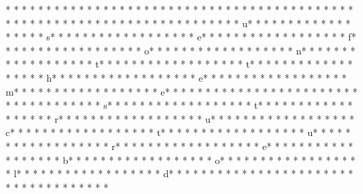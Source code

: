 {* * *  * * *  * * *  *  * * *  *  * * *  *  * * *  * * *  * * *  *  * * *  *  * * *  * %
* * *  * * *  * * *  *  * * *  *  * * *  * %
* * *  * * *  * * *  *  * * *  *  * * *  * u* * *  * * *  * * *  *  * * *  *  * * *  * s* * *  * * *  * * *  *  * * *  *  * * *  * e* * *  * * *  * * *  *  * * *  *  * * *  * f* * *  * * *  * * *  *  * * *  *  * * *  * o* * *  * * *  * * *  *  * * *  *  * * *  * n* * *  * * *  * * *  *  * * *  *  * * *  * t* * *  * * *  * * *  *  * * *  *  * * *  * t* * *  * * *  * * *  *  * * *  *  * * *  * h* * *  * * *  * * *  *  * * *  *  * * *  * e* * *  * * *  * * *  *  * * *  *  * * *  * m* * *  * * *  * * *  *  * * *  *  * * *  * e* * *  * * *  * * *  *  * * *  *  * * *  * {* * *  * * *  * * *  *  * * *  *  * * *  * s* * *  * * *  * * *  *  * * *  *  * * *  * t* * *  * * *  * * *  *  * * *  *  * * *  * r* * *  * * *  * * *  *  * * *  *  * * *  * u* * *  * * *  * * *  *  * * *  *  * * *  * c* * *  * * *  * * *  *  * * *  *  * * *  * t* * *  * * *  * * *  *  * * *  *  * * *  * u* * *  * * *  * * *  *  * * *  *  * * *  * r* * *  * * *  * * *  *  * * *  *  * * *  * e* * *  * * *  * * *  *  * * *  *  * * *  * b* * *  * * *  * * *  *  * * *  *  * * *  * o* * *  * * *  * * *  *  * * *  *  * * *  * l* * *  * * *  * * *  *  * * *  *  * * *  * d* * *  * * *  * * *  *  * * *  *  * * *  * }* * *  * * *  * * *  *  * * *  *  * * *  * 
}
